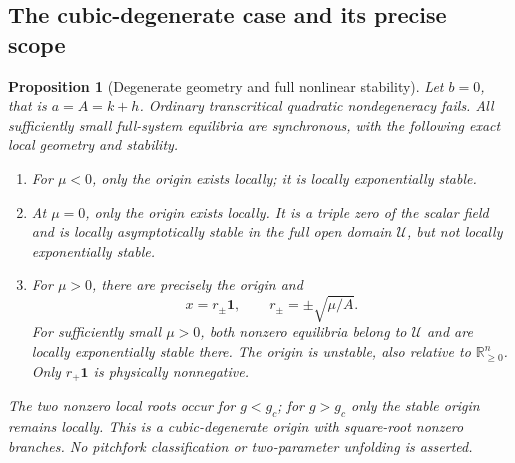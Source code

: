 \documentclass[11pt]{article}
\newcommand{\R}{\mathbb{R}}
\newcommand{\one}{\mathbf{1}}
\newcommand{\Orth}{\R_{\geq 0}^{n}}
\newcommand{\Domain}{\mathcal{U}}
\newtheorem{proposition}[theorem]{Proposition}
\theoremstyle{definition}
\theoremstyle{remark}
\begin{document}
\subsection{The cubic-degenerate case and its precise scope}
\label{slot:P09-3}

\begin{proposition}[Degenerate geometry and full nonlinear stability]
\label{prop:P09-degenerate}
Let $b=0$, that is $a=A=k+h$. Ordinary transcritical quadratic
nondegeneracy fails. All sufficiently small full-system equilibria are
synchronous, with the following exact local geometry and stability.
\begin{enumerate}[label=(\roman*),leftmargin=*]
\item For $\mu<0$, only the origin exists locally; it is locally exponentially stable.
\item At $\mu=0$, only the origin exists locally. It is a triple zero
of the scalar field and is locally asymptotically stable in the full
open domain $\Domain$, but not locally exponentially stable.
\item For $\mu>0$, there are precisely the origin and
\begin{equation}
 x=r_\pm\one,\qquad r_\pm=\pm\sqrt{\mu/A}.
 \label{eq:P09-square-root}
\end{equation}
For sufficiently small $\mu>0$, both nonzero equilibria belong to
$\Domain$ and are locally exponentially stable there. The origin is
unstable, also relative to $\Orth$. Only $r_+\one$ is physically
nonnegative.
\end{enumerate}
The two nonzero local roots occur for $g<g_c$; for $g>g_c$ only the
stable origin remains locally. This is a cubic-degenerate origin with
square-root nonzero branches. No pitchfork classification or
two-parameter unfolding is asserted.
\end{proposition}
\end{document}
